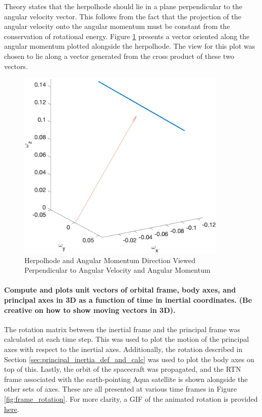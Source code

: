Theory states that the herpolhode should lie in a plane perpendicular to the angular velocity vector. This follows from the fact that the projection of the angular velocity onto the angular momentum must be constant from the conservation of rotational energy. Figure \ref{fig:herpolhode_perpendicular} presents a vector oriented along the angular momentum plotted alongside the herpolhode. The view for this plot was chosen to lie along a vector generated from the cross product of these two vectors. 

\begin{figure}[H]
    \centering
    \captionsetup{justification = centering}
    \includegraphics[width = 10cm]{Images/herpolhode_normal_EA.png}
    \caption{Herpolhode and Angular Momentum Direction Viewed Perpendicular to Angular Velocity and Angular Momentum}
    \label{fig:herpolhode_perpendicular}
\end{figure}

\paragraph{Compute and plots unit vectors of orbital frame, body axes, and principal axes in 3D as a function of time in inertial coordinates. (Be creative on how to show moving vectors in 3D).}

The rotation matrix between the inertial frame and the principal frame was calculated at each time step. This was used to plot the motion of the principal axes with respect to the inertial axes. Additionally, the rotation described in Section \ref{sec:principal_inertia_def_and_calc} was used to plot the body axes on top of this. Lastly, the orbit of the spacecraft was propagated, and the RTN frame associated with the earth-pointing Aqua satellite is shown alongside the other sets of axes. These are all presented at various time frames in Figure \ref{fig:frame_rotation}. For more clarity, a GIF of the animated rotation is provided \href{https://github.com/riordk626/AA279C-AQUA/blob/main/Images/reference_frame_gif_EA.gif}{here}.

